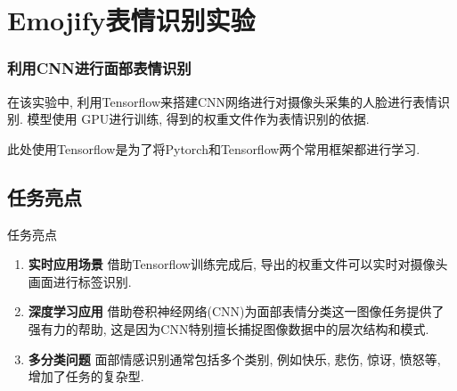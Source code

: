 \documentclass{beamer}
\begin{document}
\section{Emojify表情识别实验}
\begin{frame}
	\frametitle{利用CNN进行面部表情识别}

	在该实验中, 利用Tensorflow来搭建CNN网络进行对摄像头采集的人脸进行表情识别. 模型使用
	GPU进行训练, 得到的权重文件作为表情识别的依据.

	此处使用Tensorflow是为了将Pytorch和Tensorflow两个常用框架都进行学习.

\end{frame}

\subsection{任务亮点}
\begin{frame}[fragile]{任务亮点}
	\begin{enumerate}
		\item \textbf{实时应用场景} 借助Tensorflow训练完成后, 导出的权重文件可以实时对摄像头画面进行标签识别.
		\item \textbf{深度学习应用} 借助卷积神经网络(CNN)为面部表情分类这一图像任务提供了强有力的帮助, 这是因为CNN特别擅长捕捉图像数据中的层次结构和模式.
		\item \textbf{多分类问题} 面部情感识别通常包括多个类别, 例如快乐, 悲伤, 惊讶, 愤怒等, 增加了任务的复杂型.
	\end{enumerate}
\end{frame}
\end{document}
